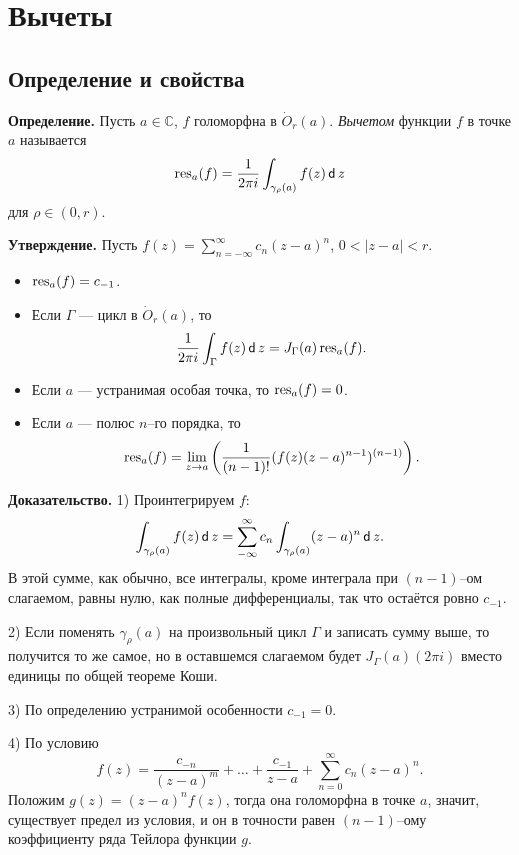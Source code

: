 \QED

\section{Вычеты}
\subsection{Определение и свойства}
\textbf{Определение.} Пусть $a \in \mathbb C$, $f$ голоморфна в $\dot O_r(a)$.
\textit{Вычетом} функции $f$ в точке $a$ называется 
\[
    \operatorname{res}_a(f) = \frac{1}{2\pi i} \int_{\gamma_\rho(a)} f(z) \operatorname{\mathsf d} z
\]
для $\rho \in (0, r)$.

\textbf{Утверждение.}
Пусть $f(z) = \sum_{n=-\infty}^{\infty} c_n(z - a)^n$, $0 < |z - a| < r$.
\begin{itemize}
    \item $\operatorname{res}_a(f) = c_{-1}$.
    \item Если $\Gamma$ --- цикл в $\dot O_r(a)$, то
        \[
            \frac{1}{2\pi i} \int_\Gamma f(z) \operatorname{\mathsf d} z = J_\Gamma(a) \operatorname{res}_a(f).
        \]
    \item Если $a$ --- устранимая особая точка, то $\operatorname{res}_a(f) = 0$.
    \item Если $a$ --- полюс $n$--го порядка, то
        \[
            \operatorname{res}_a(f) = \lim_{z \to a} \left( \frac{1}{(n-1)!} (f(z) (z - a)^{n-1})^{(n-1)} \right).
        \]
\end{itemize}

\textbf{Доказательство.} 1) Проинтегрируем $f$:
\[
    \int_{\gamma_\rho(a)} f(z) \operatorname{\mathsf d} z = \sum_{-\infty}^{\infty} c_n \int_{\gamma_\rho(a)} (z - a)^n \operatorname{\mathsf d} z.
\]
В этой сумме, как обычно, все интегралы, кроме интеграла при $(n-1)$--ом слагаемом, равны нулю, как полные дифференциалы, так что остаётся ровно $c_{-1}$.

2) Если поменять $\gamma_\rho(a)$ на произвольный цикл $\Gamma$ и записать сумму выше, то получится то же самое, но в оставшемся слагаемом будет $J_\Gamma(a) (2\pi i)$ вместо единицы по общей теореме Коши.

3) По определению устранимой особенности $c_{-1} = 0$.

4) По условию
\[
    f(z) = \frac{c_{-n}}{(z - a)^m} + \dots + \frac{c_{-1}}{z - a} + \sum_{n=0}^{\infty} c_n(z - a)^n.
\]
Положим $g(z) = (z - a)^n f(z)$, тогда она голоморфна в точке $a$, значит, существует предел из условия, и он в точности равен $(n-1)$--ому коэффициенту ряда Тейлора функции $g$.

\QED

